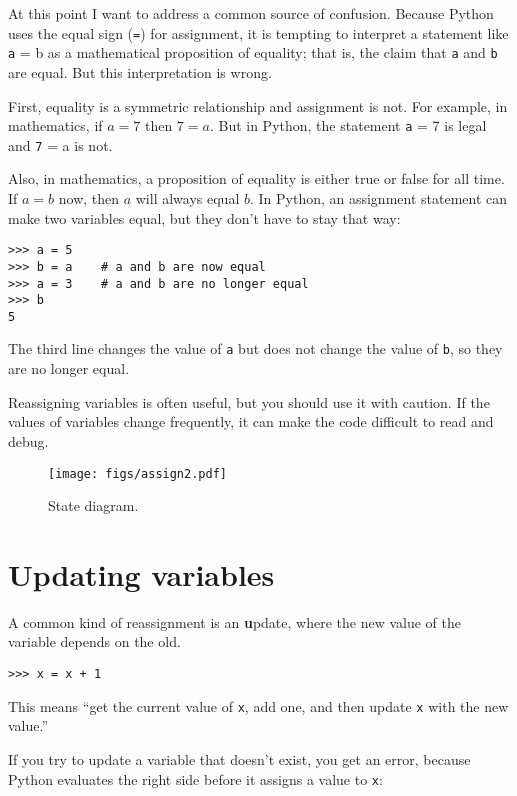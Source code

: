 \documentclass[
DIV=11,
fontsize=12,
twoside,
headinclude=false,
titlepage=firstiscover,
abstract=true,
headsepline=true,
footsepline=true,
chapterprefix=true, %
headings=big,
bibliography=totoc,%
captions=tableheading
]{scrbook}
\theoremstyle{definition}
\begin{document}
At this point I want to address a common source of
confusion.
Because Python uses the equal sign ({\texttt =}) for assignment, it is
tempting to interpret a statement like {\texttt a = b} as a
mathematical
proposition of equality; that is, the claim that {\texttt a} and
{\texttt b} are equal.  But this interpretation is wrong.

First, equality is a symmetric relationship and assignment is not.  For
example, in mathematics, if $a=7$ then $7=a$.  But in Python, the
statement {\texttt a = 7} is legal and {\texttt 7 = a} is not.

Also, in mathematics, a proposition of equality is either true or
false for all time.  If $a=b$ now, then $a$ will always equal $b$.
In Python, an assignment statement can make two variables equal, but
they don't have to stay that way:

\begin{lstlisting}
>>> a = 5
>>> b = a    # a and b are now equal
>>> a = 3    # a and b are no longer equal
>>> b
5
\end{lstlisting}
%
The third line changes the value of {\texttt a} but does not change the
value of {\texttt b}, so they are no longer equal. 

Reassigning variables is often useful, but you should use it
with caution.  If the values of variables change frequently, it can
make the code difficult to read and debug.

\begin{figure}
\centerline
{\texttt{[image: figs/assign2.pdf]}}
\caption{State diagram.}
\label{fig.assign2}
\end{figure}



\section{Updating variables}
\label{update}


A common kind of reassignment is an {\textbf update},
where the new value of the variable depends on the old.

\begin{lstlisting}
>>> x = x + 1
\end{lstlisting}
%
This means ``get the current value of {\texttt x}, add one, and then
update {\texttt x} with the new value.''

If you try to update a variable that doesn't exist, you get an
error, because Python evaluates the right side before it assigns
a value to {\texttt x}:
\end{document}
